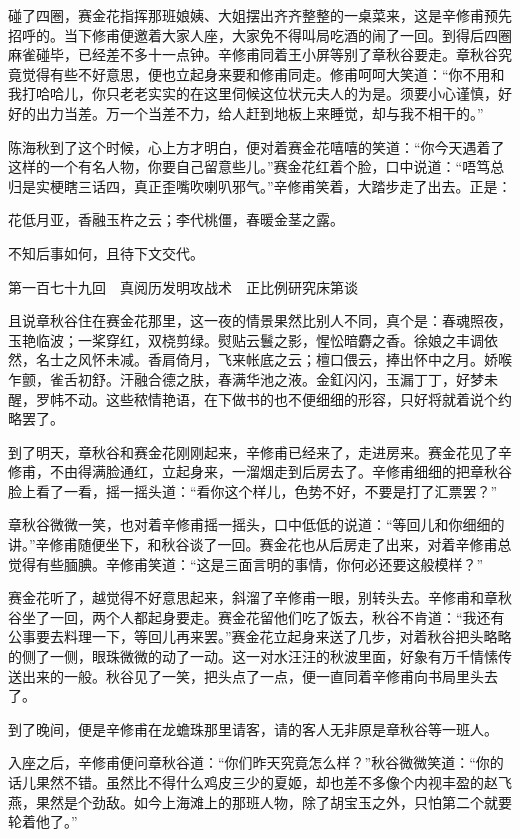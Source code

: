 \documentclass[12pt,UTF8]{ctexbook}
\begin{document}
{{{碰了四圈，赛金花指挥那班娘姨、大姐摆出齐齐整整的一桌菜来，这是辛修甫预先招呼的。当下修甫便邀着大家人座，大家免不得叫局吃酒的闹了一回。到得后四圈麻雀碰毕，已经差不多十一点钟。辛修甫同着王小屏等别了章秋谷要走。章秋谷究竟觉得有些不好意思，便也立起身来要和修甫同走。修甫呵呵大笑道：“你不用和我打哈哈儿，你只老老实实的在这里伺候这位状元夫人的为是。须要小心谨慎，好好的出力当差。万一个当差不力，给人赶到地板上来睡觉，却与我不相干的。”

陈海秋到了这个时候，心上方才明白，便对着赛金花嘻嘻的笑道：“你今天遇着了这样的一个有名人物，你要自己留意些儿。”赛金花红着个脸，口中说道：“唔笃总归是实梗瞎三话四，真正歪嘴吹喇叭邪气。”辛修甫笑着，大踏步走了出去。正是：

花低月亚，香融玉杵之云；李代桃僵，春暖金茎之露。

不知后事如何，且待下文交代。





第一百七十九回　真阅历发明攻战术　正比例研究床第谈





且说章秋谷住在赛金花那里，这一夜的情景果然比别人不同，真个是：春魂照夜，玉艳临波；一桨穿红，双桡剪绿。熨贴云鬟之影，惺忪暗麝之香。徐娘之丰调依然，名士之风怀未减。香肩倚月，飞来帐底之云；檀口偎云，捧出怀中之月。娇喉乍颤，雀舌初舒。汗融合德之肤，春满华池之液。金釭闪闪，玉漏丁丁，好梦未醒，罗帏不动。这些秾情艳语，在下做书的也不便细细的形容，只好将就着说个约略罢了。

到了明天，章秋谷和赛金花刚刚起来，辛修甫已经来了，走进房来。赛金花见了辛修甫，不由得满脸通红，立起身来，一溜烟走到后房去了。辛修甫细细的把章秋谷脸上看了一看，摇一摇头道：“看你这个样儿，色势不好，不要是打了汇票罢？”

章秋谷微微一笑，也对着辛修甫摇一摇头，口中低低的说道：“等回儿和你细细的讲。”辛修甫随便坐下，和秋谷谈了一回。赛金花也从后房走了出来，对着辛修甫总觉得有些腼腆。辛修甫笑道：“这是三面言明的事情，你何必还要这般模样？”

赛金花听了，越觉得不好意思起来，斜溜了辛修甫一眼，别转头去。辛修甫和章秋谷坐了一回，两个人都起身要走。赛金花留他们吃了饭去，秋谷不肯道：“我还有公事要去料理一下，等回儿再来罢。”赛金花立起身来送了几步，对着秋谷把头略略的侧了一侧，眼珠微微的动了一动。这一对水汪汪的秋波里面，好象有万千情愫传送出来的一般。秋谷见了一笑，把头点了一点，便一直同着辛修甫向书局里头去了。

到了晚间，便是辛修甫在龙蟾珠那里请客，请的客人无非原是章秋谷等一班人。

入座之后，辛修甫便问章秋谷道：“你们昨天究竟怎么样？”秋谷微微笑道：“你的话儿果然不错。虽然比不得什么鸡皮三少的夏姬，却也差不多像个内视丰盈的赵飞燕，果然是个劲敌。如今上海滩上的那班人物，除了胡宝玉之外，只怕第二个就要轮着他了。”

}}}
\end{document}
